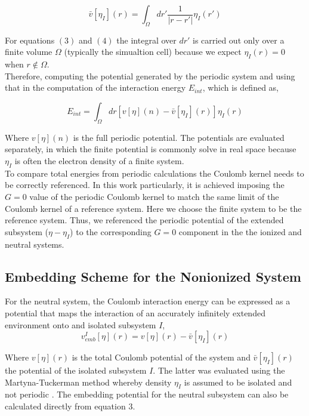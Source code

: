 \documentclass[12pt,a4paper]{article}
\begin{document}
\begin{equation}
	\bar{v} [\eta_I](r) = \int_{\Omega} dr' \frac{1}{|r-r'|} \eta_{I}(r')
\end{equation}

For equations $(3)$ and $(4)$ the integral over $dr'$ is carried out only over a finite volume $\Omega$ (typically the simualtion cell) because we expect $\eta_{I}(r)=0$ when $r \not\in \Omega$. \\

Therefore, computing the potential generated by the periodic system and using that in the computation of the interaction energy $E_{int}$,
which is defined as,

\begin{equation}
	E_{int} = \int_{\Omega} dr [v[\eta](n)-\bar{v}[\eta_{I}](r)]\eta_{I}(r)
\end{equation}

Where $v[\eta](n)$ is the full periodic potential. The potentials are evaluated separately, in which the finite potential is commonly solve in real 
space because $\eta_{I}$ is often the electron density of a finite system. \\

To compare total energies from periodic calculations the Coulomb kernel needs to be correctly referenced. In this work particularly, it is achieved 
imposing the $G=0$ value of the periodic Coulomb kernel to match the same limit of the Coulomb kernel of a reference system. Here we choose the
finite system to be the reference system. Thus, we referenced the periodic potential of the extended subsystem ($\eta -\eta_{I}$) to the corresponding
$G=0$ component in the the ionized and neutral systems. \\

\subsection{Embedding Scheme for the Nonionized System}

For the neutral system, the Coulomb interaction energy can be expressed as a potential that maps the interaction of an accurately infinitely extended
environment onto and isolated subsystem $I$, \\

\begin{equation}
	v^{I}_{emb} [\eta] (r) = v[\eta](r) - \bar{v} [\eta_I](r)
\end{equation}

Where $v[\eta](r)$ is the total Coulomb potential of the system and $\bar{v} [\eta_I](r)$ the potential of the isolated subsystem $I$. The latter was
evaluated using the Martyna-Tuckerman method whereby density $\eta_I$ is assumed to be isolated and not periodic \cite{martyna1999reciprocal}.
The embedding potential for the neutral subsystem can also be calculated directly from equation $3$. \\
\end{document}
